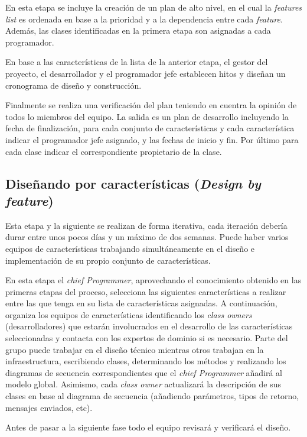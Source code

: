 \documentclass[11pt]{article}
\begin{document}
En esta etapa se incluye la creación de un plan de alto nivel, en el cual la \textit{features list} es ordenada en base a la
prioridad y a la dependencia entre cada \textit{feature}. Además, las clases identificadas en la primera etapa son
asignadas a cada programador.

En base a las características de la lista de la anterior etapa, el gestor del proyecto, el desarrollador y el programador jefe establecen hitos y diseñan un cronograma de diseño y construcción.


Finalmente se realiza una verificación del plan teniendo en cuentra la opinión de todos lo miembros del equipo. La salida es un plan de desarrollo incluyendo la fecha de finalización, para cada conjunto de características y cada característica indicar el programador jefe asignado, y las fechas de inicio y fin. Por último para cada clase indicar el correspondiente propietario de la clase.


\subsection{Diseñando por características (\textit{Design by feature})}
Esta etapa y la siguiente se realizan de forma iterativa, cada iteración debería durar entre unos pocos días y un máximo de dos semanas. Puede haber varios equipos de características trabajando simultáneamente en el diseño e implementación de su propio conjunto de características. 

En esta etapa el \textit{chief Programmer}, aprovechando el conocimiento obtenido en las primeras etapas del proceso, selecciona las siguientes características a realizar entre las que tenga en su lista de características asignadas. A continuación, organiza los equipos de características identificando los \textit{class owners} (desarrolladores) que estarán involucrados en el desarrollo de las características seleccionadas y contacta con los expertos de dominio si es necesario. Parte del grupo puede trabajar en el diseño técnico mientras otros trabajan en la infraestructura, escribiendo clases, determinando los métodos y realizando los diagramas de secuencia correspondientes que el \textit{chief Programmer} añadirá al modelo global. Asimismo, cada \textit{class owner} actualizará la descripción de sus clases en base al diagrama de secuencia (añadiendo parámetros, tipos de retorno, mensajes enviados, etc).

Antes de pasar a la siguiente fase todo el equipo revisará y verificará el diseño.
\end{document}
